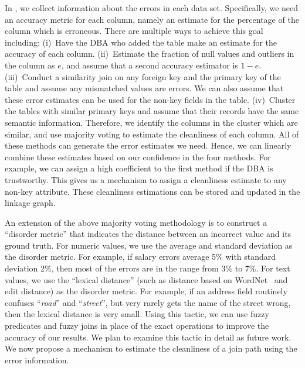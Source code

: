 In \dcv, we collect information about the errors in each data set. 
Specifically, we need an accuracy metric for each column, namely an estimate for the percentage of the column which is erroneous. There are multiple ways to achieve this goal including: 
(i)~Have the DBA who added the table make an estimate for the accuracy of each column. 
(ii)~Estimate the fraction of null values and outliers in the column as $e$, and assume that a second accuracy estimator is $1-e$.
(iii)~Conduct a similarity join on any foreign key and the primary key of the table and assume any mismatched values are errors. We can also assume that these error estimates can be used for the non-key fields in the table. 
(iv)~Cluster the tables with similar primary keys and assume that their records have the same semantic information.  Therefore, we identify the columns in the cluster which are similar, and use majority voting to estimate the cleanliness of each column. 
All of these methods can generate the  error estimates we need. 
Hence, we can linearly combine these estimates based on our confidence in the four methods. For example, we can assign a high coefficient to the first method if the DBA is trustworthy. This gives us a mechanism to assign a cleanliness estimate to any non-key attribute. These cleanliness estimations can be stored and updated in the linkage graph.

An extension of the above majority voting methodology is to construct a ``disorder metric'' that indicates the distance between an incorrect value and its ground truth. For numeric values, we use the average and standard deviation as the disorder metric. For example, if salary errors average 5\% with standard deviation 2\%, then most of the errors are in the range from 3\% to 7\%. For text values, we use the ``lexical distance'' (such as distance based on WordNet~\cite{WordNet,DBLP:journals/cacm/Miller95} and edit distance) as the disorder metric. For example, if an address field routinely confuses ``\textit{road}'' and ``\textit{street}'', but very rarely gets the name of the street wrong, then the lexical distance is very small. Using this tactic, we can use fuzzy predicates and fuzzy joins in place of the exact operations to improve the accuracy of our results.
We plan to examine this tactic in detail as future work. We now propose a mechanism to estimate the cleanliness of a join path using the error information.


